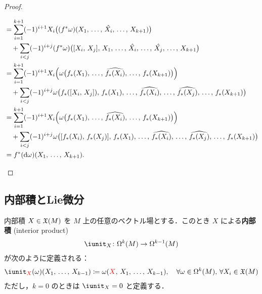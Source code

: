 \documentclass[geometry_main]{subfiles}
\begin{document}
\begin{proof}
\begin{enumerate}
\begin{align}
			&= \sum_{i=1}^{k+1} (-1)^{i+1} X_i \bigl( (f^*\omega)(X_1,\, \dots ,\, \hat{X_i},\, \dots,\, X_{k+1}) \bigr) \\
			&\quad + \sum_{i < j} (-1)^{i+j} (f^*\omega) \bigl( [X_i,\, X_j],\, X_1,\, \dots ,\, \hat{X_i},\, \dots ,\, \hat{X_j},\, \dots ,\, X_{k+1} \bigr) \\
			&= \sum_{i=1}^{k+1} (-1)^{i+1} X_i \Bigl( \omega\bigl(f_*(X_1),\, \dots ,\, \widehat{f_*(X_i)},\, \dots,\, f_*(X_{k+1})\bigr) \Bigr) \\
			&\quad + \sum_{i < j} (-1)^{i+j} \omega \bigl( f_*([X_i,\, X_j]),\, f_*(X_1),\, \dots ,\, \widehat{f_*(X_i)},\, \dots ,\, \widehat{f_*(X_j)},\, \dots ,\, f_*(X_{k+1}) \bigr) \\
			&= \sum_{i=1}^{k+1} (-1)^{i+1} X_i \Bigl( \omega\bigl(f_*(X_1),\, \dots ,\, \widehat{f_*(X_i)},\, \dots,\, f_*(X_{k+1})\bigr) \Bigr) \\
			&\quad + \sum_{i < j} (-1)^{i+j} \omega \bigl( [f_*(X_i),\, f_*(X_j)],\, f_*(X_1),\, \dots ,\, \widehat{f_*(X_i)},\, \dots ,\, \widehat{f_*(X_j)},\, \dots ,\, f_*(X_{k+1}) \bigr) \\
			&= f^*(\dd{\omega}) (X_1,\, \dots ,\, X_{k+1}).
		\end{align}
	\end{enumerate}
\end{proof}

\subsection{内部積とLie微分}

\begin{mydef}[label=int_prod]{内部積}
	$X \in \mathfrak{X}(M)$ を $M$ 上の任意のベクトル場とする．このとき $X$ による\textbf{内部積} (interior product) 
	\begin{align} 
		\iunit_X \colon \Omega^k(M) \to \Omega^{k-1}(M)
	\end{align}
	が次のように定義される：
	\begin{align} 
		\iunit_{\textcolor{red}{X}}(\omega)(X_1,\, \dots ,\, X_{k-1}) \coloneqq \omega(\textcolor{red}{X},\, X_1,\, \dots ,\, X_{k-1}),\quad \forall \omega \in \Omega^k(M),\, \forall X_i \in \vecfield{M}
	\end{align}
	ただし，$k=0$ のときは $\iunit_X = 0$ と定義する．
\end{mydef}
	
\end{document}
